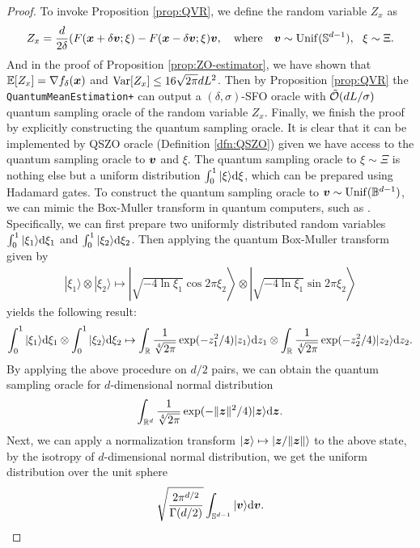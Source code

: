 \propqzoest*
\begin{proof}
	To invoke Proposition \ref{prop:QVR}, we define the random variable $Z_x$ as
	\begin{align*}
		Z_x =  \frac{d}{2 \delta} ( F({\bm{x}} + \delta {\bm{v}};\xi ) - F({\bm{x}} - \delta {\bm{v}};\xi) {\bm{v}}, \quad {\rm where} \quad {\bm{v}} \sim {\rm Unif}({\mathbb{S}}^{d-1}), ~~ \xi \sim \Xi.
	\end{align*}
	And in the proof of Proposition \ref{prop:ZO-estimator}, we have shown that $ \mathbb{E}[Z_x] = \nabla f_{\delta}({\bm{x}})$ and ${\rm Var}[Z_x] \le 16 \sqrt{2 \pi} dL^2$. 
	Then by Proposition \ref{prop:QVR} the \texttt{QuantumMeanEstimation+} can output a $(\delta,\sigma)$-SFO oracle with $\tilde {{\mathcal{O}}}( d L / \sigma)$ quantum sampling oracle of the random variable $Z_x$. Finally, we finish the proof by explicitly constructing the quantum sampling oracle. It is clear that it can be implemented by QSZO oracle (Definition \ref{dfn:QSZO}) given we have access to the quantum sampling oracle to ${\bm{v}}$ and $\xi$. 
	The quantum sampling oracle to $\xi \sim \Xi$ is nothing else but a uniform distribution $\int_0^1 | \xi \rangle {\rm d} \xi$, which can be prepared using Hadamard gates. To construct the quantum sampling oracle to ${\bm{v}} \sim {\rm Unif}({\mathbb{B}}^{d-1})$, we can mimic the Box-Muller transform in quantum computers, such as  \citep[Section 5.3]{chakrabarti2023quantum}. Specifically, we can first prepare two uniformly distributed random variables $\int_0^1 | \xi_1 \rangle {\rm d} \xi_1$ and $\int_0^1 | \xi_2 \rangle {\rm d} \xi_2$. Then applying the quantum Box-Muller transform given by
	\begin{align*}
		| \xi_1 \rangle \otimes |\xi_2 \rangle  \mapsto \left| \sqrt{-4 \ln \xi_1} \cos 2 \pi \xi_2 \right \rangle \otimes \left| \sqrt{-4 \ln \xi_1} \sin 2 \pi \xi_2 \right \rangle
	\end{align*}
	yields the following result:
	\begin{align*}
		\int_0^1 | \xi_1 \rangle {\rm d} \xi_1 \otimes \int_0^1 | \xi_2 \rangle {\rm d} \xi_2 \mapsto \int_{{\mathbb{R}}} \frac{1}{\sqrt[4]{2 \pi}} \exp(-z_1^2 /4) | z_1 \rangle {\rm d} z_1 \otimes \int_{{\mathbb{R}}} \frac{1}{\sqrt[4]{2 \pi}} \exp(-z_2^2 /4) | z_2 \rangle {\rm d} z_2.
	\end{align*}
	By applying the above procedure on $d/2$ pairs, we can obtain the quantum sampling oracle for $d$-dimensional normal distribution
	\begin{align*}
		\int_{{\mathbb{R}}^d} \frac{1}{\sqrt[4]{2 \pi}} \exp( - \Vert {\bm{z}} \Vert^2/4) | {\bm{z}} \rangle {\rm d} {\bm{z}}. 
	\end{align*}
	Next, we can apply a normalization transform $ | {\bm{z}} \rangle \mapsto | {\bm{z}} / \Vert {\bm{z}} \Vert \rangle $ to the above state, by the isotropy of $d$-dimensional normal distribution, we get the uniform distribution over the unit sphere
	\begin{align} \label{eq:state-sphere}
		\sqrt{ \frac{2 \pi^{d/2}}{\Gamma(d/2)} }\int_{{\mathbb{S}}^{d-1}} | {\bm{v}} \rangle {\rm d} {\bm{v}}.
	\end{align}
\end{proof}

